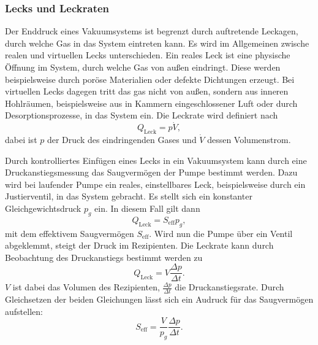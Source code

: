 \subsubsection{Lecks und Leckraten}
Der Enddruck eines Vakuumsystems ist begrenzt durch auftretende Leckagen, durch welche Gas in das System eintreten kann.
Es wird im Allgemeinen zwische realen und virtuellen Lecks unterschieden. Ein reales Leck ist eine physische Öffnung im System, durch welche Gas von außen
eindringt. Diese werden beispielsweise durch poröse Materialien oder defekte Dichtungen erzeugt.
Bei virtuellen Lecks dagegen tritt das gas nicht von außen, sondern aus inneren Hohlräumen, beispielsweise aus in Kammern eingeschlossener Luft oder durch Desorptionsprozesse,
in das System ein.
Die Leckrate wird definiert nach
\begin{equation}
    Q_\text{Leck} = p \dot V ,
\end{equation}
dabei ist $p$ der Druck des eindringenden Gases und $\dot{V}$ dessen Volumenstrom.

Durch kontrolliertes Einfügen eines Lecks in ein Vakuumsystem kann durch eine Druckanstiegsmessung das Saugvermögen der Pumpe bestimmt werden.
Dazu wird bei laufender Pumpe ein reales, einstellbares Leck, beispielsweise durch ein Justierventil, in das System gebracht.
Es stellt sich ein konstanter Gleichgewichtsdruck $p_g$ ein. In diesem Fall gilt dann
\begin{equation}
    Q_\text{Leck} = S_\text{eff} p_g ,
\end{equation}
mit dem effektivem Saugvermögen $S_\text{eff}$.
Wird nun die Pumpe über ein Ventil abgeklemmt, steigt der Druck im Rezipienten. Die Leckrate kann durch Beobachtung des Druckanstiegs bestimmt werden zu
\begin{equation}
    \label{eq:Leckrate}
    Q_\text{Leck} = V \frac{\Delta p }{\Delta t} .
\end{equation}
$V$ ist dabei das Volumen des Rezipienten, $\frac{\Delta p }{\Delta t}$ die Druckanstiegsrate.
Durch Gleichsetzen der beiden Gleichungen lässt sich ein Audruck für das Saugvermögen aufstellen:
\begin{equation}
    \label{eq:s_leck}
    S_\text{eff} = \frac{V}{p_g} \frac{\Delta p }{\Delta t} . 
\end{equation}
\cite{V070_glossar}